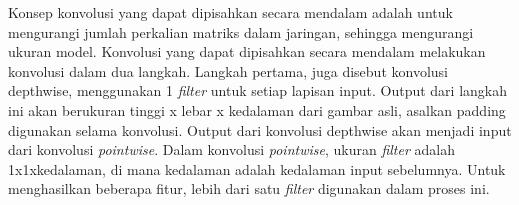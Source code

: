 Konsep konvolusi yang dapat dipisahkan secara mendalam adalah untuk mengurangi jumlah perkalian matriks dalam jaringan, sehingga mengurangi ukuran model. Konvolusi yang dapat dipisahkan secara mendalam melakukan konvolusi dalam dua langkah. Langkah pertama, juga disebut konvolusi depthwise, menggunakan 1 \textit{filter} untuk setiap lapisan input. Output dari langkah ini akan berukuran tinggi x lebar x kedalaman dari gambar asli, asalkan padding digunakan selama konvolusi. Output dari konvolusi depthwise akan menjadi input dari konvolusi \textit{pointwise}. Dalam konvolusi \textit{pointwise}, ukuran \textit{filter} adalah 1x1xkedalaman, di mana kedalaman adalah kedalaman input sebelumnya. Untuk menghasilkan beberapa fitur, lebih dari satu \textit{filter} digunakan dalam proses ini.
\cite{rismiyati2020xception}




